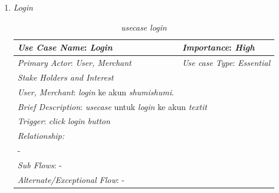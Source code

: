 \documentclass[a4paper]{article}
\begin{document}
\begin{enumerate}
\begin{enumerate}
        \item \textit{Login}
\begin{table}[h]
    \centering
    \begin{tabular}{|lll}
    \hline
    \multicolumn{1}{|l|}{\textit{Use Case Name}: \textit{Login}}             & \multicolumn{2}{l|}{\textit{Importance}: \textit{High}}   \\ \hline
    \multicolumn{1}{|l|}{\textit{Primary Actor}: \textit{User, Merchant}}             & \multicolumn{2}{l|}{\textit{Use case Type}: \textit{Essential}} \\ \hline
    \multicolumn{1}{|l|}{\textit{Stake Holders and Interest}} &                               &                               \\ \cline{1-1}
    \multicolumn{1}{|l|}{\textit{User, Merchant}: \textit{login} ke akun \textit{shumishumi}.}                                                     &                               &                               \\ \hline
    \multicolumn{3}{|l|}{\textit{Brief Description}: \textit{usecase} untuk \textit{login} ke akun \textit{textit}}                                                                         \\ \hline
    \multicolumn{3}{|l|}{\textit{Trigger}: \textit{click login button}}                                                                                   \\ \hline
    \multicolumn{3}{|l|}{\textit{Relationship:}}                                                                              \\ \hline
    \multicolumn{3}{|l|}{-}                                                                                                                     \\ \hline
    \multicolumn{3}{|l|}{\textit{Sub Flows}: -}                                                                                 \\ \hline
    \multicolumn{3}{|l|}{\textit{Alternate/Exceptional Flow}: -}                                                                \\ \hline
    \end{tabular}
    \caption{\textit{usecase login} }
\end{table}


\end{enumerate}
\end{enumerate}
\end{document}
